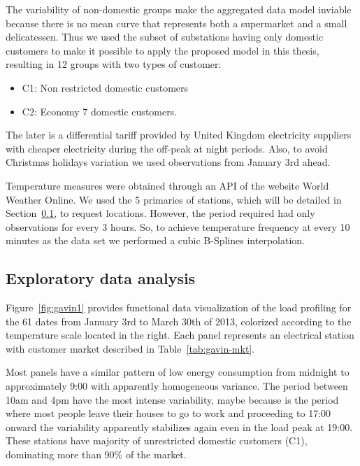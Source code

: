 The variability of non-domestic groups make the aggregated data model inviable because there is no mean curve that represents both a supermarket and a small delicatessen. Thus we used the subset of substations having only domestic customers to make it possible to apply the proposed model in this thesis, resulting in 12 groups with two types of customer:

\newpage
\begin{itemize}
\item C1: Non restricted domestic customers
\item C2: Economy 7 domestic customers.
\end{itemize}

The later is  a differential tariff provided by United Kingdom electricity suppliers with cheaper electricity during the off-peak at night periods. Also, to avoid Christmas holidays variation we used observations from January 3rd ahead.

Temperature measures were obtained through an API of the website World Weather Online. We used the 5 primaries of stations, which will be detailed in Section~\ref{sec:eda}, to request locations. However, the period required had only observations for every 3 hours. So, to achieve temperature frequency at  every 10 minutes as the data set we performed a cubic B-Splines interpolation. 


\subsection{Exploratory data analysis}
\label{sec:eda}





Figure~\ref{fig:gavin1} provides functional data visualization of the load profiling for the 61 dates from January 3rd to March 30th of 2013, colorized according to the temperature scale located in the right. Each panel represents an electrical station with customer market described in Table~\ref{tab:gavin-mkt}. 

Most panels have a similar pattern of low energy consumption from midnight to approximately 9:00 with apparently homogeneous variance. The period between 10am and 4pm have the most intense variability, maybe because is the period where most people leave their houses to go to work and proceeding to 17:00 onward the variability apparently stabilizes again even in the load peak at 19:00. These stations have majority of unrestricted domestic customers (C1), dominating more than 90\% of the market.

